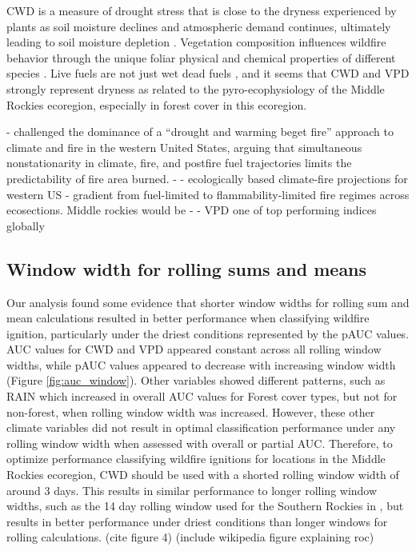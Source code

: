 \documentclass[11p]{article}
\begin{document}
CWD is a measure of drought stress that is close to the dryness experienced by plants as soil moisture declines and atmospheric demand continues, ultimately leading to soil moisture depletion \citep{stephensonActualEvapotranspirationDeficit1998}. Vegetation composition influences wildfire behavior through the unique foliar physical and chemical properties of different species \citep{mattjollySeasonalVariationsRed2016}. Live fuels are not just wet dead fuels \citep{jollyPyroEcophysiologyShiftingParadigm2018}, and it seems that CWD and VPD strongly represent dryness as related to the pyro-ecophysiology of the Middle Rockies ecoregion, especially in forest cover in this ecoregion.

- \citet{littellClimateChangeFuture2018} challenged the dominance of a “drought and warming beget fire” approach to climate and fire in the western United States, arguing that simultaneous nonstationarity in climate, fire, and postfire fuel trajectories limits the predictability of fire area burned.
- \citet{littellClimateChangeFuture2018} - ecologically based climate-fire projections for western US - gradient from fuel-limited to flammability-limited fire regimes across ecosections. Middle rockies would be
- \citet{zacharakisEnvironmentalForestFire2023} - VPD one of top performing indices globally

\subsection{Window width for rolling sums and means}

Our analysis found some evidence that shorter window widths for rolling sum and mean calculations resulted in better performance when classifying wildfire ignition, particularly under the driest conditions represented by the pAUC values. AUC values for CWD and VPD appeared constant across all rolling window widths, while pAUC values appeared to decrease with increasing window width (Figure \ref{fig:auc_window}). Other variables showed different patterns, such as RAIN which increased in overall AUC values for Forest cover types, but not for non-forest, when rolling window width was increased. However, these other climate variables did not result in optimal classification performance under any rolling window width when assessed with overall or partial AUC. Therefore, to optimize performance classifying wildfire ignitions for locations in the Middle Rockies ecoregion, CWD should be used with a shorted rolling window width of around 3 days. This results in similar performance to longer rolling window widths, such as the 14 day rolling window used for the Southern Rockies in  \citet{thomaWaterBalanceIndicator2020}, but results in better performance under driest conditions than longer windows for rolling calculations. (cite figure 4) (include wikipedia figure explaining roc)
\end{document}
